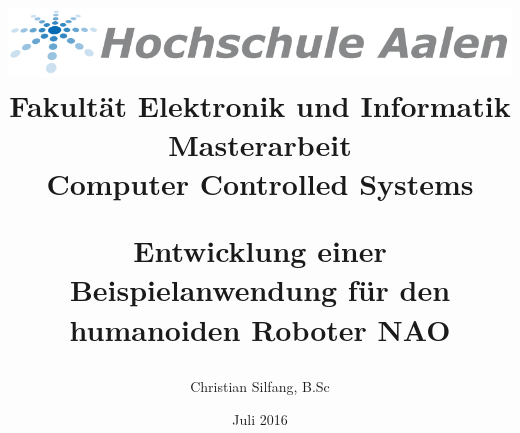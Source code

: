 \begin{titlepage}
\title{
	\begin{center}
		\Huge{\includegraphics[scale=0.5]{title/logo_htw_aalen.png}}\\
		\large{Fakultät Elektronik und Informatik}\\
		\vspace{1cm}
		\Huge{Masterarbeit}\\
		\large{Computer Controlled Systems}\\
	\end{center}
	\vspace{1cm}
	\begin{center}
		\Huge{Entwicklung einer Beispielanwendung für den humanoiden Roboter NAO}\\
		\vspace{3cm}
	\end{center}
}
\author{Christian Silfang, B.Sc}
\vfill
\date{\Huge{Juli 2016}}

\end{titlepage} 

